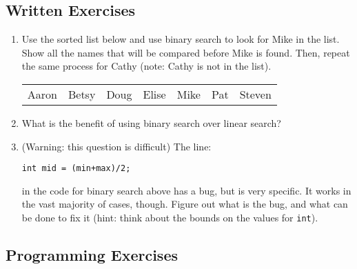 \subsection{Written Exercises}

\setcounter{counter}{1}
\begin{enumerate}[label={\arabic{counter}\addtocounter{counter}{1}}.]

\item Use the sorted list below and use binary search to look for Mike in the list. Show all the names that will be compared before Mike is found. Then, repeat the same process for Cathy (note: Cathy is not in the list).
\begin{table}[h]
\begin{tabular}{lllllll}
Aaron & Betsy & Doug & Elise & Mike & Pat & Steven
\end{tabular}
\end{table}

\item What is the benefit of using binary search over linear search?

\item (Warning: this question is difficult) The line:
\begin{lstlisting}
int mid = (min+max)/2;
\end{lstlisting}
in the code for binary search above has a bug, but is very specific. It works in the vast majority of cases, though. Figure out what is the bug, and what can be done to fix it (hint: think about the bounds on the values for \verb|int|).

\end{enumerate}

\subsection{Programming Exercises}